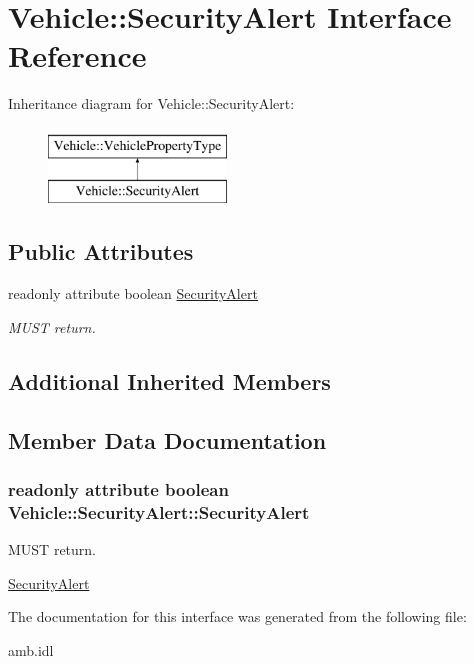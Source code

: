 \hypertarget{interfaceVehicle_1_1SecurityAlert}{\section{Vehicle\-:\-:Security\-Alert Interface Reference}
\label{interfaceVehicle_1_1SecurityAlert}
}
Inheritance diagram for Vehicle\-:\-:Security\-Alert\-:\begin{figure}[H]
\begin{center}
\leavevmode
\includegraphics[height=2.000000cm]{interfaceVehicle_1_1SecurityAlert}
\end{center}
\end{figure}
\subsection*{Public Attributes}
\begin{DoxyCompactItemize}
\item 
readonly attribute boolean \hyperlink{interfaceVehicle_1_1SecurityAlert_aabea98f4f053520f6429db25df33ef4a}{Security\-Alert}
\begin{DoxyCompactList}\small\item\em M\-U\-S\-T return. \end{DoxyCompactList}\end{DoxyCompactItemize}
\subsection*{Additional Inherited Members}


\subsection{Member Data Documentation}
\hypertarget{interfaceVehicle_1_1SecurityAlert_aabea98f4f053520f6429db25df33ef4a}{
\subsubsection[{Security\-Alert}]{\setlength{\rightskip}{0pt plus 5cm}readonly attribute boolean Vehicle\-::\-Security\-Alert\-::\-Security\-Alert}}\label{interfaceVehicle_1_1SecurityAlert_aabea98f4f053520f6429db25df33ef4a}


M\-U\-S\-T return. 

\hyperlink{interfaceVehicle_1_1SecurityAlert}{Security\-Alert} 

The documentation for this interface was generated from the following file\-:\begin{DoxyCompactItemize}
\item 
amb.\-idl\end{DoxyCompactItemize}
